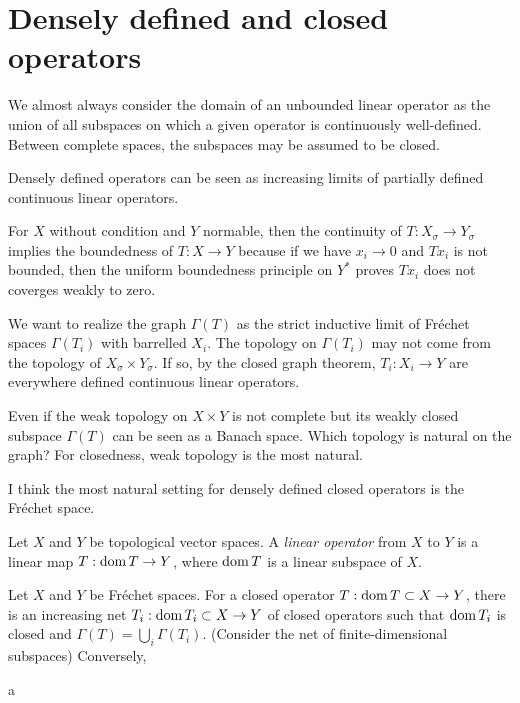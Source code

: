 \documentclass{../../large}
\begin{document}
\section{Densely defined and closed operators}


We almost always consider the domain of an unbounded linear operator as the union of all subspaces on which a given operator is continuously well-defined.
Between complete spaces, the subspaces may be assumed to be closed.

Densely defined operators can be seen as increasing limits of partially defined continuous linear operators.


For $X$ without condition and $Y$ normable, then the continuity of $T:X_\sigma\to Y_\sigma$ implies the boundedness of $T:X\to Y$ because if we have $x_i\to0$ and $Tx_i$ is not bounded, then the uniform boundedness principle on $Y^*$ proves $Tx_i$ does not coverges weakly to zero.


We want to realize the graph $\Gamma(T)$ as the strict inductive limit of Fr\'echet spaces $\Gamma(T_i)$ with barrelled $X_i$.
The topology on $\Gamma(T_i)$ may not come from the topology of $X_\sigma\times Y_\sigma$.
If so, by the closed graph theorem, $T_i:X_i\to Y$ are everywhere defined continuous linear operators.


Even if the weak topology on $X\times Y$ is not complete but its weakly closed subspace $\Gamma(T)$ can be seen as a Banach space.
Which topology is natural on the graph?
For closedness, weak topology is the most natural.


I think the most natural setting for densely defined closed operators is the Fr\'echet space.

\begin{prb}
Let $X$ and $Y$ be topological vector spaces.
A \emph{linear operator} from $X$ to $Y$ is a linear map $T:\operatorname{dom} T\to Y$, where $\operatorname{dom} T$ is a linear subspace of $X$.

\end{prb}

\begin{prb}
Let $X$ and $Y$ be Fr\'echet spaces.
For a closed operator $T:\operatorname{dom} T\subset X\to Y$, there is an increasing net $T_i:\operatorname{dom} T_i\subset X\to Y$ of closed operators such that $\operatorname{dom} T_i$ is closed and $\Gamma(T)=\bigcup_i\Gamma(T_i)$. (Consider the net of finite-dimensional subspaces)
Conversely, 

\begin{parts}
\item a
\end{parts}
\end{prb}
\end{document}
